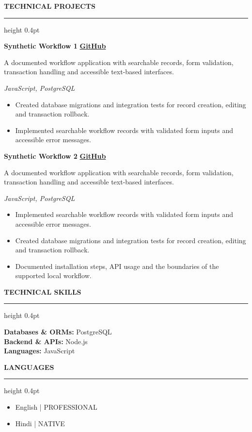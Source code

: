 \documentclass[10pt,a4paper]{article}
\newcommand{\atsSectionToSection}{6.1pt}
\newcommand{\atsHeadingToContent}{2pt}
\newcommand{\atsEntryToEntry}{3.4pt}
\newcommand{\atsProjectTitleToTech}{1pt}
\newcommand{\atsProjectTechToBullets}{1.5pt}
\newcommand{\atsBulletToBullet}{0.6pt}
\newcommand{\atssection}[1]{%
  \vspace{\atsSectionToSection}%
  {\noindent\large\bfseries\uppercase{#1}}\par
  \vspace{1.5pt}\hrule height 0.4pt\vspace{\atsHeadingToContent}%
}
\begin{document}
\atssection{Technical Projects}
\textbf{Synthetic Workflow 1} \hfill {\small \href{https://github.com/synthetic-fixture/project-3}{\textbf{GitHub}}}\par
A documented workflow application with searchable records, form validation, transaction handling and accessible text-based interfaces.\par
\vspace{\atsProjectTitleToTech}
{\textit{JavaScript, PostgreSQL}}\par
\vspace{\atsProjectTechToBullets}
\begin{itemize}
\setlength{\itemsep}{\atsBulletToBullet}\setlength{\parskip}{0pt}\setlength{\parsep}{0pt}\setlength{\topsep}{0pt}\setlength{\partopsep}{0pt}
  \item Created database migrations and integration tests for record creation, editing and transaction rollback.
  \item Implemented searchable workflow records with validated form inputs and accessible error messages.
\end{itemize}
\vspace{\atsEntryToEntry}
\textbf{Synthetic Workflow 2} \hfill {\small \href{https://github.com/synthetic-fixture/project-4}{\textbf{GitHub}}}\par
A documented workflow application with searchable records, form validation, transaction handling and accessible text-based interfaces.\par
\vspace{\atsProjectTitleToTech}
{\textit{JavaScript, PostgreSQL}}\par
\vspace{\atsProjectTechToBullets}
\begin{itemize}
\setlength{\itemsep}{\atsBulletToBullet}\setlength{\parskip}{0pt}\setlength{\parsep}{0pt}\setlength{\topsep}{0pt}\setlength{\partopsep}{0pt}
  \item Implemented searchable workflow records with validated form inputs and accessible error messages.
  \item Created database migrations and integration tests for record creation, editing and transaction rollback.
  \item Documented installation steps, API usage and the boundaries of the supported local workflow.
\end{itemize}

\atssection{Technical Skills}
\textbf{Databases \& ORMs:} PostgreSQL\\
\textbf{Backend \& APIs:} Node.js\\
\textbf{Languages:} JavaScript\par

\atssection{Languages}
\begin{itemize}
\item English | PROFESSIONAL
\item Hindi | NATIVE
\end{itemize}
\end{document}
